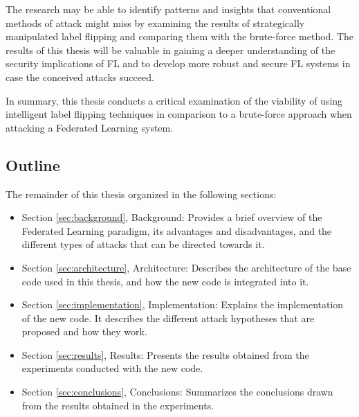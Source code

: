 The research may be able to identify patterns and insights that conventional methods of attack might miss by examining the results of strategically manipulated label flipping and comparing them with the brute-force method.
The results of this thesis will be valuable in gaining a deeper understanding of the security implications of FL and to develop more robust and secure FL systems in case the conceived attacks succeed.


In summary, this thesis conducts a critical examination of the viability of using intelligent label flipping techniques in comparison to a brute-force approach when attacking a Federated Learning system.

\subsection{Outline}
The remainder of this thesis organized in the following sections:
\begin{itemize}
    \item Section \ref{sec:background}, Background: Provides a brief overview of the Federated Learning paradigm, its advantages and disadvantages, and the different types of attacks that can be directed towards it.
    \item Section \ref{sec:architecture}, Architecture: Describes the architecture of the base code used in this thesis, and how the new code is integrated into it.
    \item Section \ref{sec:implementation}, Implementation: Explains the implementation of the new code. It describes the different attack hypotheses that are proposed and how they work.
    \item Section \ref{sec:results}, Results: Presents the results obtained from the experiments conducted with the new code.
    \item Section \ref{sec:conclusions}, Conclusions: Summarizes the conclusions drawn from the results obtained in the experiments.
\end{itemize}

\pagebreak